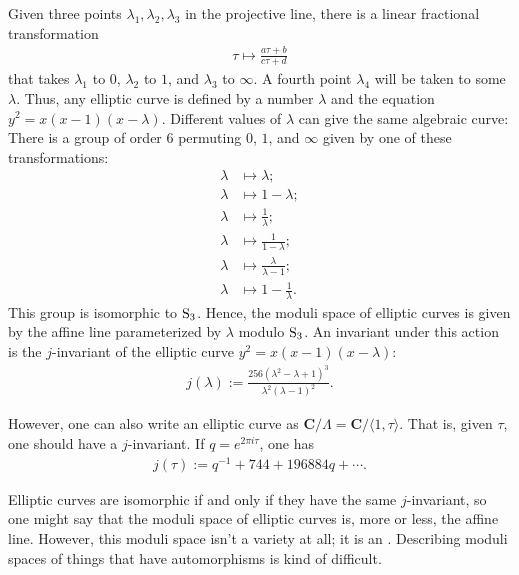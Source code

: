 \documentclass [11 pt, oneside, margin = 1 in] {article}
\begin{document}
Given three points $\lambda_1,\lambda_2,\lambda_3$ in the projective line, there is a linear fractional transformation 
\begin{align*}
	\tau\longmapsto \frac{a\tau+b}{c\tau+d}
\end{align*}
that takes $\lambda_1$ to $0$, $\lambda_2$ to $1$, and $\lambda_3$ to $\infty$. A fourth point $\lambda_4$ will be taken to some $\lambda$. Thus, any elliptic curve is defined by a number $\lambda$ and the equation $y^2=x(x-1) (x-\lambda)$. Different values of $\lambda$ can give the same algebraic curve: There is a group of order $6$ permuting $0$, $1$, and $\infty$ given by one of these transformations:
\begin{align*}
	\lambda&\longmapsto\lambda;\\
	\lambda&\longmapsto 1-\lambda;\\
	\lambda&\longmapsto\frac{1}{\lambda};\\
	\lambda&\longmapsto \frac{1}{1-\lambda};\\
	\lambda&\longmapsto \frac{\lambda}{\lambda-1};\\
	\lambda&\longmapsto 1-\frac{1}{\lambda}.
\end{align*}
This group is isomorphic to $\operatorname{S}_3$. Hence, the moduli space of elliptic curves is given by the affine line parameterized by $\lambda$ modulo $\operatorname{S}_3$. An invariant under this action is the $j$-invariant of the elliptic curve $y^2 = x(x-1) (x-\lambda)$:
\begin{align*}
	j(\lambda) := \frac{256(\lambda^2-\lambda+1)^3}{\lambda^2(\lambda-1)^2}.
\end{align*}

However, one can also write an elliptic curve as $\mathbf{C}/\Lambda=\mathbf{C}/\langle 1,\tau\rangle$. That is, given $\tau$, one should have a $j$-invariant. If $q=e^{2\pi i\tau}$, one has
\begin{align*}
	j(\tau) := q ^{-1} + 744 + 196884q + \cdots.
\end{align*}

Elliptic curves are isomorphic if and only if they have the same $j$-invariant, so one might say that the moduli space of elliptic curves is, more or less, the affine line. However, this moduli space isn't a variety at all; it is an . Describing moduli spaces of things that have automorphisms is kind of difficult.
\end{document}
